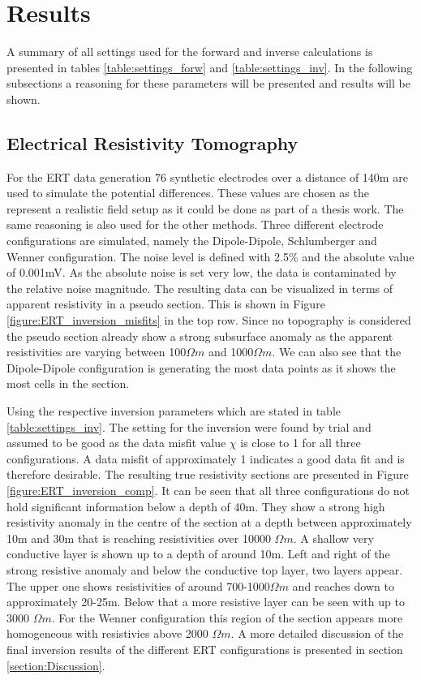 \section{Results}\label{section:Results}

A summary of all settings used for the forward and inverse calculations is presented in tables \ref{table:settings_forw} and \ref{table:settings_inv}. In the following subsections a reasoning for these parameters will be presented and results will be shown. 

\subsection{Electrical Resistivity Tomography}
For the ERT data generation 76 synthetic electrodes over a distance of 140m are used to simulate the potential differences. These values are chosen as the represent a realistic field setup as it could be done as part of a thesis work. The same reasoning is also used for the other methods. Three different electrode configurations are simulated, namely the Dipole-Dipole, Schlumberger and Wenner configuration. The noise level is defined with 2.5\% and the absolute value of 0.001mV. As the absolute noise is set very low, the data is contaminated by the relative noise magnitude. The resulting data can be visualized in terms of apparent resistivity in a pseudo section. This is shown in Figure \ref{figure:ERT_inversion_misfits} in the top row. Since no topography is considered the pseudo section already show a strong subsurface anomaly as the apparent resistivities are varying between 100$\Omega m$ and 1000$\Omega m$. We can also see that the Dipole-Dipole configuration is generating the most data points as it shows the most cells in the section. 

Using the respective inversion parameters which are stated in table \ref{table:settings_inv}. The setting for the inversion were found by trial and assumed to be good as the data misfit value $\chi$ is close to 1 for all three configurations. A data misfit of approximately 1 indicates a good data fit and is therefore desirable. The resulting true resistivity sections are presented in Figure \ref{figure:ERT_inversion_comp}. It can be seen that all three configurations do not hold significant information below a depth of 40m. They show a strong high resistivity anomaly in the centre of the section at a depth between approximately 10m and 30m that is reaching resistivities over 10000 $\Omega m$. A shallow very conductive layer is shown up to a depth of around 10m. Left and right of the strong resistive anomaly and below the conductive top layer, two layers appear. The upper one shows resistivities of around 700-1000$\Omega m$ and reaches down to approximately 20-25m. Below that a more resistive layer can be seen with up to 3000 $\Omega m$. For the Wenner configuration this region of the section appears more homogeneous with resistivies above 2000 $\Omega m$. A more detailed discussion of the final inversion results of the different ERT configurations is presented in section \ref{section:Discussion}.

